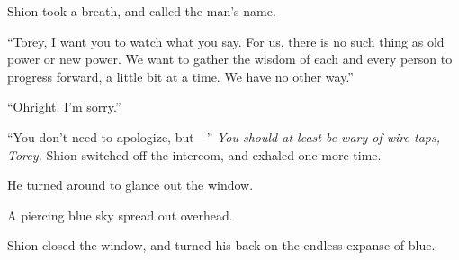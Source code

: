 Shion took a breath, and called the man's name.

``Torey, I want you to watch what you say. For us, there is no such
thing as old power or new power. We want to gather the wisdom of each
and every person to progress forward, a little bit at a time. We have no
other way.''

``Oh\el right. I'm sorry.''

``You don't need to apologize, but---'' \emph{You should at least be wary of
wire-taps, Torey.} Shion switched off the intercom, and exhaled one more
time.

He turned around to glance out the window.

A piercing blue sky spread out overhead.

Shion closed the window, and turned his back on the endless expanse of
blue.